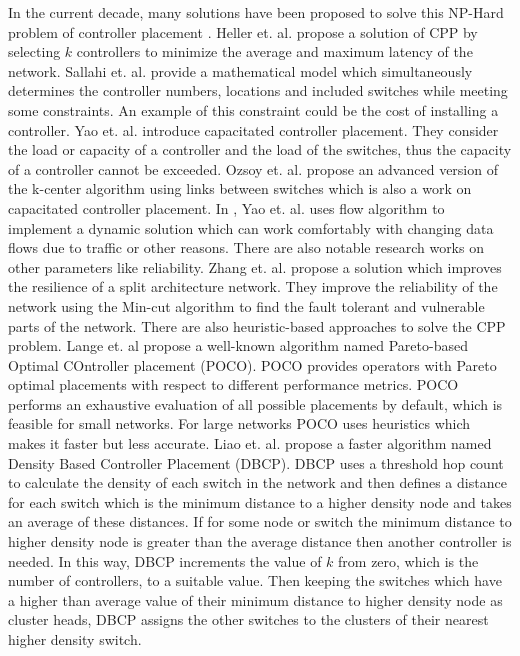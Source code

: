 \documentclass[times]{dacauth}
\begin{document}
In the current decade, many solutions have been proposed to solve this NP-Hard problem of controller placement \cite{cpp2012heller, cppsurvey2017, cppsurvey2018}. Heller et. al. \cite{cpp2012heller} propose a solution of CPP by selecting $k$ controllers to minimize the average and maximum latency of the network. Sallahi et. al. \cite{sallahi2015optimal} provide a mathematical model which simultaneously determines the controller numbers, locations and included switches while meeting some constraints. An example of this constraint could be the cost of installing a controller. Yao et. al. \cite{yao2014capacitated} introduce capacitated controller placement. They consider the load or capacity of a controller and the load of the switches, thus the capacity of a controller cannot be exceeded. Ozsoy et. al.\cite{ozsoy2006exact} propose an advanced version of the k-center algorithm using links between switches which is also a work on capacitated controller placement. In \cite{yao2015controller}, Yao et. al. uses flow algorithm to implement a dynamic solution which can work comfortably with changing data flows due to traffic or other reasons.
There are also notable research works on other parameters like reliability. Zhang et. al. \cite{zhang2011resilience} propose a solution which improves the resilience of a split architecture network. They improve the reliability of the network using the Min-cut algorithm \cite{erlebach2006robustness} to find the fault tolerant and vulnerable parts of the network. There are also heuristic-based approaches to solve the CPP problem. Lange et. al\cite{lange2015heuristic} propose a well-known algorithm named Pareto-based Optimal COntroller placement (POCO). POCO provides operators with Pareto optimal placements with respect to different performance metrics. POCO performs an exhaustive evaluation of all possible placements by default, which is feasible for small networks. For large networks POCO uses heuristics which makes it faster but less accurate.
Liao et. al.\cite{dbcp2017} propose a faster algorithm named Density Based Controller Placement (DBCP). DBCP uses a threshold hop count to calculate the density of each switch in the network and then defines a distance for each switch which is the minimum distance to a higher density node and takes an average of these distances. If for some node or switch the minimum distance to higher density node is greater than the average distance then another controller is needed. In this way, DBCP increments the value of $k$ from zero, which is the number of controllers, to a suitable value. Then keeping the switches which have a higher than average value of their minimum distance to higher density node as cluster heads, DBCP assigns the other switches to the clusters of their nearest higher density switch.
\end{document}
